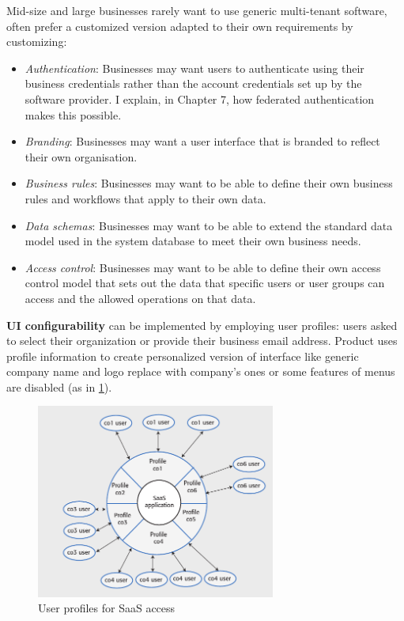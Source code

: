\documentclass[10pt,a4paper]{report}
\begin{document}
Mid-size and large businesses rarely want to use generic multi-tenant software, often prefer a customized version adapted to their own requirements by customizing:
\begin{itemize}
	\item \textit{Authentication}:
	Businesses may want users to authenticate using their business credentials rather
	than the account credentials set up by the software provider. I explain, in Chapter 7,
	how federated authentication makes this possible.
	\item \textit{Branding}:
	Businesses may want a user interface that is branded to reflect their own organisation.
	\item \textit{Business rules}:
	Businesses may want to be able to define their own business rules and workflows that
	apply to their own data.
	\item \textit{Data schemas}:
	Businesses may want to be able to extend the standard data model used in the
	system database to meet their own business needs.
	\item \textit{Access control}:
	Businesses may want to be able to define their own access control model that sets out
	the data that specific users or user groups can access and the allowed operations on
	that data.
\end{itemize}

\textbf{UI configurability} can be implemented by employing user profiles: users asked to select their organization or provide their business email address. Product uses profile information to
create personalized version of interface like generic company name and logo replace
with company’s ones or some features of menus are disabled (as in \ref{image54}).
   \begin{figure}[h]
	\centering
	\includegraphics[width=0.7\textwidth]{image54}
	\caption{User profiles for SaaS access}
	\label{image54}
\end{figure}
\end{document}
